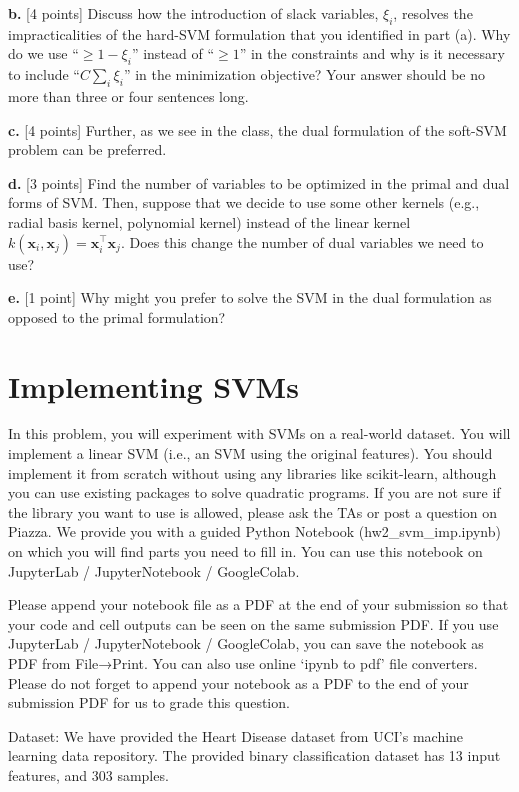 \documentclass[a3paper,12pt]{extarticle} %
\begin{document}
\noindent \textbf{b.} [4 points] Discuss how the introduction of slack variables, $\xi_i$, resolves the impracticalities of the hard-SVM formulation that you identified in part (a). Why do we use “$\geq 1 - \xi_i$” instead of “$\geq 1$” in the constraints and why is it necessary to include “$C \sum_i \xi_i$” in the minimization objective? Your answer should be no more than three or four sentences long.

\noindent \textbf{c.} [4 points] Further, as we see in the class, the dual formulation of the soft-SVM problem can be preferred.

\noindent \textbf{d.} [3 points] Find the number of variables to be optimized in the primal and dual forms of SVM. Then, suppose that we decide to use some other kernels (e.g., radial basis kernel, polynomial kernel) instead of the linear kernel \( k(\mathbf{x}_i, \mathbf{x}_j) = \mathbf{x}_i^\top \mathbf{x}_j \). Does this change the number of dual variables we need to use?

\noindent \textbf{e.} [1 point] Why might you prefer to solve the SVM in the dual formulation as opposed to the primal formulation?

\newpage
\section {Implementing SVMs}

In this problem, you will experiment with SVMs on a real-world dataset. You will implement a linear SVM (i.e., an SVM using the original features). You should implement it from scratch without using any libraries like scikit-learn, although you can use existing packages to solve quadratic programs. If you are not sure if the library you want to use is allowed, please ask the TAs or post a question on Piazza. We provide you with a guided Python Notebook (hw2\_svm\_imp.ipynb) on which you will find parts you need to fill in. You can use this notebook on JupyterLab / JupyterNotebook / GoogleColab.

Please append your notebook file as a PDF at the end of your submission so that your code and cell outputs can be seen on the same submission PDF. If you use JupyterLab / JupyterNotebook / GoogleColab, you can save the notebook as PDF from File→Print. You can also use online ‘ipynb to pdf’ file converters. Please do not forget to append your notebook as a PDF to the end of your submission PDF for us to grade this question.

Dataset: We have provided the Heart Disease dataset from UCI’s machine learning data repository. The provided binary classification dataset has 13 input features, and 303 samples.
\end{document}
